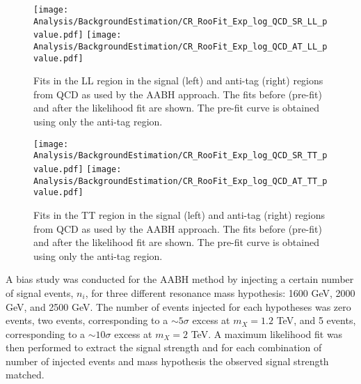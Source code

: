 \begin{figure}[h!]
\centering
\texttt{[image: Analysis/BackgroundEstimation/CR\_RooFit\_Exp\_log\_QCD\_SR\_LL\_pvalue.pdf]}
\texttt{[image: Analysis/BackgroundEstimation/CR\_RooFit\_Exp\_log\_QCD\_AT\_LL\_pvalue.pdf]}
  \caption{Fits in the LL region in the signal (left) and anti-tag (right) regions from QCD as used by the AABH approach. The fits before (pre-fit) and after the likelihood fit are shown. The pre-fit curve is obtained using only the anti-tag region.}
\label{fig:MCaabhLL}
\end{figure}

\begin{figure}[h!]
\centering
\texttt{[image: Analysis/BackgroundEstimation/CR\_RooFit\_Exp\_log\_QCD\_SR\_TT\_pvalue.pdf]}
\texttt{[image: Analysis/BackgroundEstimation/CR\_RooFit\_Exp\_log\_QCD\_AT\_TT\_pvalue.pdf]}
\caption{Fits in the TT region in the signal (left) and anti-tag (right) regions from QCD as used by the AABH approach. The fits before (pre-fit) and after the likelihood fit are shown. The pre-fit curve is obtained using only the anti-tag region.}
\label{fig:MCaabhTT}
\end{figure}

A bias study was conducted for the AABH method by injecting a certain number of signal events, $n_{i}$, for three different resonance mass hypothesis: 1600 GeV, 2000 GeV, and 2500 GeV. The number of events injected for each hypotheses was zero events, two events, corresponding to a ${\sim}5\sigma$ excess at $m_{X}=1.2$ TeV, and 5 events, corresponding to a ${\sim}10\sigma$ excess at $m_{X}=2$ TeV. A maximum likelihood fit was then performed to extract the signal strength and for each combination of number of injected events and mass hypothesis the observed signal strength matched. 




